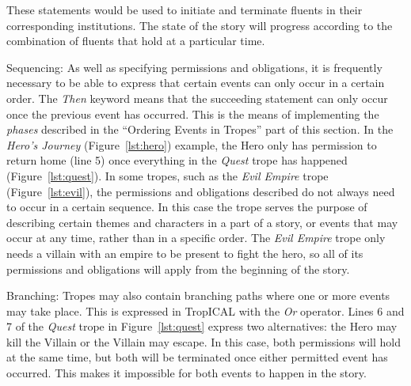 \documentclass[11pt]{report}
\begin{document}
\begin{compactdesc}
These statements would be used to initiate and terminate fluents in their
corresponding institutions. The state of the story will progress according to
the combination of fluents that hold at a particular time.

\item[Sequencing:]
As well as specifying permissions and obligations, it is frequently necessary to be able to express that certain events can only occur in a certain order. The \emph{Then} keyword means that the succeeding statement can only occur once the previous event has occurred. This is the means of implementing the \emph{phases} described in the ``Ordering Events in Tropes'' part of this section. In the \emph{Hero's Journey} (Figure~\ref{lst:hero}) example, the Hero only has permission to return home (line 5) once everything in the \emph{Quest} trope has happened (Figure~\ref{lst:quest}).
In some tropes, such as the \emph{Evil Empire} trope (Figure~\ref{lst:evil}), the permissions and obligations described do not always need to occur in a certain sequence. In this case the trope serves the purpose of describing certain themes and characters in a part of a story, or events that may occur at any time, rather than in a specific order. The \emph{Evil Empire} trope only needs a villain with an empire to be present to fight the hero, so all of its permissions and obligations will apply from the beginning of the story.

\item[Branching:]
Tropes may also contain branching paths where one or more events may take place. This is expressed in TropICAL with the \emph{Or} operator. Lines 6 and 7 of the \emph{Quest} trope in Figure~\ref{lst:quest} express two alternatives: the Hero may kill the Villain or the Villain may escape. In this case, both permissions will hold at the same time, but both will be terminated once either permitted event has occurred. This makes it impossible for both events to happen in the story.


\end{compactdesc}
\end{document}
